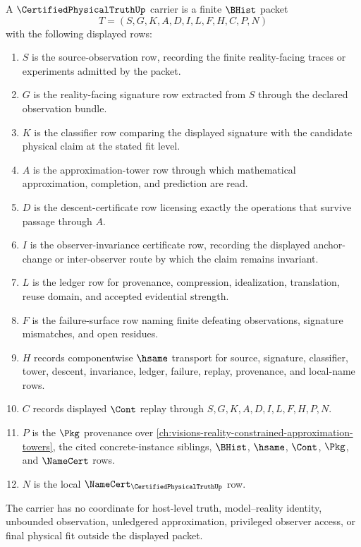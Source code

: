 \begin{definition}
\label{def:certified-physical-truth-carrier}
A $\CertifiedPhysicalTruthUp$ carrier is a finite $\BHist$ packet
$$
T=(S,G,K,A,D,I,L,F,H,C,P,N)
$$
with the following displayed rows:
\begin{enumerate}
\item $S$ is the source-observation row, recording the finite reality-facing traces or experiments admitted by the packet.
\item $G$ is the reality-facing signature row extracted from $S$ through the declared observation bundle.
\item $K$ is the classifier row comparing the displayed signature with the candidate physical claim at the stated fit level.
\item $A$ is the approximation-tower row through which mathematical approximation, completion, and prediction are read.
\item $D$ is the descent-certificate row licensing exactly the operations that survive passage through $A$.
\item $I$ is the observer-invariance certificate row, recording the displayed anchor-change or inter-observer route by which the claim remains invariant.
\item $L$ is the ledger row for provenance, compression, idealization, translation, reuse domain, and accepted evidential strength.
\item $F$ is the failure-surface row naming finite defeating observations, signature mismatches, and open residues.
\item $H$ records componentwise $\hsame$ transport for source, signature, classifier, tower, descent, invariance, ledger, failure, replay, provenance, and local-name rows.
\item $C$ records displayed $\Cont$ replay through $S,G,K,A,D,I,L,F,H,P,N$.
\item $P$ is the $\Pkg$ provenance over \autoref{ch:visions-reality-constrained-approximation-towers}, the cited concrete-instance siblings, $\BHist$, $\hsame$, $\Cont$, $\Pkg$, and $\NameCert$ rows.
\item $N$ is the local $\NameCert_{\CertifiedPhysicalTruthUp}$ row.
\end{enumerate}
The carrier has no coordinate for host-level truth, model--reality identity, unbounded observation, unledgered approximation, privileged observer access, or final physical fit outside the displayed packet.
\end{definition}

